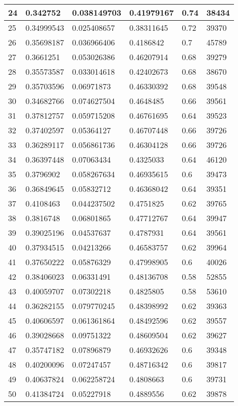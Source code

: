 \begin{longtable}{|l|l|l|l|l|l|}
24 & 0.342752 & 0.038149703 & 0.41979167 & 0.74 & 38434 \\ \hline 
25 & 0.34999543 & 0.025408657 & 0.38311645 & 0.72 & 39370 \\ \hline 
26 & 0.35698187 & 0.036966406 & 0.4186842 & 0.7 & 45789 \\ \hline 
27 & 0.3661251 & 0.053026386 & 0.46207914 & 0.68 & 39279 \\ \hline 
28 & 0.35573587 & 0.033014618 & 0.42402673 & 0.68 & 38670 \\ \hline 
29 & 0.35703596 & 0.06971873 & 0.46330392 & 0.68 & 39548 \\ \hline 
30 & 0.34682766 & 0.074627504 & 0.4648485 & 0.66 & 39561 \\ \hline 
31 & 0.37812757 & 0.059715208 & 0.46761695 & 0.64 & 39523 \\ \hline 
32 & 0.37402597 & 0.05364127 & 0.46707448 & 0.66 & 39726 \\ \hline 
33 & 0.36289117 & 0.056861736 & 0.46304128 & 0.66 & 39726 \\ \hline 
34 & 0.36397448 & 0.07063434 & 0.4325033 & 0.64 & 46120 \\ \hline 
35 & 0.3796902 & 0.058267634 & 0.46935615 & 0.6 & 39473 \\ \hline 
36 & 0.36849645 & 0.05832712 & 0.46368042 & 0.64 & 39351 \\ \hline 
37 & 0.4108463 & 0.044237502 & 0.4751825 & 0.62 & 39765 \\ \hline 
38 & 0.3816748 & 0.06801865 & 0.47712767 & 0.64 & 39947 \\ \hline 
39 & 0.39025196 & 0.04537637 & 0.4787931 & 0.64 & 39561 \\ \hline 
40 & 0.37934515 & 0.04213266 & 0.46583757 & 0.62 & 39964 \\ \hline 
41 & 0.37650222 & 0.05876329 & 0.47998905 & 0.6 & 40026 \\ \hline 
42 & 0.38406023 & 0.06331491 & 0.48136708 & 0.58 & 52855 \\ \hline 
43 & 0.40059707 & 0.07302218 & 0.4825805 & 0.58 & 53610 \\ \hline 
44 & 0.36282155 & 0.079770245 & 0.48398992 & 0.62 & 39363 \\ \hline 
45 & 0.40606597 & 0.061361864 & 0.48492596 & 0.62 & 39557 \\ \hline 
46 & 0.39028668 & 0.09751322 & 0.48609504 & 0.62 & 39627 \\ \hline 
47 & 0.35747182 & 0.07896879 & 0.46932626 & 0.6 & 39348 \\ \hline 
48 & 0.40200096 & 0.07247457 & 0.48716342 & 0.6 & 39817 \\ \hline 
49 & 0.40637824 & 0.062258724 & 0.4808663 & 0.6 & 39731 \\ \hline 
50 & 0.41384724 & 0.05227918 & 0.4889556 & 0.62 & 39878 \\ \hline 
\end{longtable}